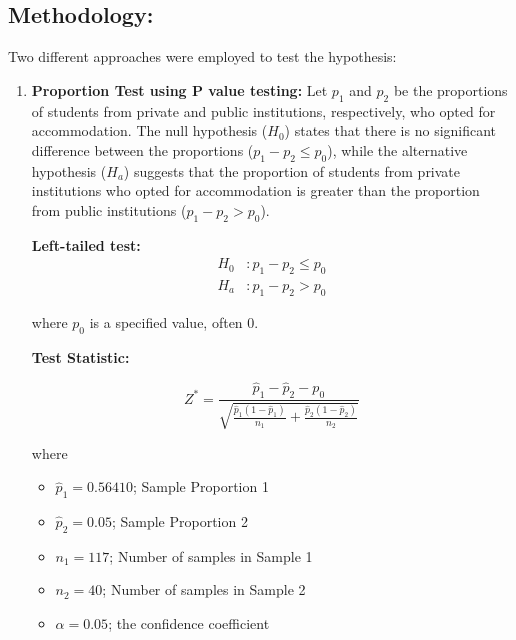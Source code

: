 \documentclass[oneside]{book}
\begin{document}
\subsection*{Methodology:}
Two different approaches were employed to test the hypothesis:

\begin{enumerate}
    
   \item \textbf{Proportion Test using P value testing:}
    Let \( p_1 \) and \( p_2 \) be the proportions of students from private and public institutions, respectively, who opted for accommodation. The null hypothesis (\( H_0 \)) states that there is no significant difference between the proportions (\( p_1 - p_2 \leq p_0 \)), while the alternative hypothesis (\( H_a \)) suggests that the proportion of students from private institutions who opted for accommodation is greater than the proportion from public institutions (\( p_1 - p_2 > p_0 \)).


 \textbf{ Left-tailed test:}
\[
\begin{aligned}
    H_0 & : p_1 - p_2 \leq p_0 \\
    H_a & : p_1 - p_2 > p_0
\end{aligned}
\]

where \( p_0 \) is a specified value, often 0.

\textbf{Test Statistic:}

\[
Z^* = \frac{{\hat{p}_1 - \hat{p}_2 - p_0}}{{\sqrt{\frac{{\hat{p}_1(1-\hat{p}_1)}}{{n_1}} + \frac{{\hat{p}_2(1-\hat{p}_2)}}{{n_2}}}}}
\]

where
\begin{itemize}
    \item $\hat{p}_1 = 0.56410$; Sample Proportion 1
    \item $\hat{p}_2 = 0.05$; Sample Proportion 2
    \item $n_1 = 117$; Number of samples in Sample 1 
    \item $n_2 = 40$; Number of samples in Sample 2
    \item $\alpha = 0.05$; the confidence coefficient
\end{itemize}


\end{enumerate}
\end{document}
